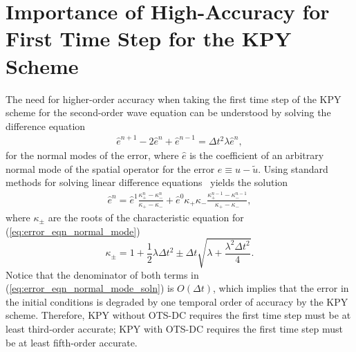 \documentclass[fleqn,12pt,twoside]{article}
\newcommand{\beq}{\begin{equation}}
\newcommand{\eeq}{\end{equation}}
\newcommand{\bea}{\begin{eqnarray}}
\newcommand{\eea}{\end{eqnarray}}
\def\tu{\tilde{u}}
\def\he{\hat{e}}
\def\dt{\Delta t}
\begin{document}
\section{Importance of High-Accuracy for First Time Step for the KPY Scheme
         \label{appendix:KPY_analysis} }
The need for higher-order accuracy when taking the first time step of the KPY 
scheme for the second-order wave equation can be understood by solving the 
difference equation 
\bea
  \he^{n+1} - 2 \he^{n} + \he^{n-1} = \dt^2 \lambda \he^{n}
  \label{eq:error_eqn_normal_mode},
\eea
for the normal modes of the error, where $\he$ is the coefficient of an 
arbitrary normal mode of the spatial operator for the error 
$e \equiv u - \tu$.  Using standard methods for solving linear difference
equations~\cite{carrier_pearson_book} yields the solution
\bea
  \he^n = \he^1 \frac{\kappa_+^n - \kappa_-^n}{\kappa_+ - \kappa_-}
        + \he^0 \kappa_+ \kappa_-
          \frac{\kappa_+^{n-1} - \kappa_-^{n-1}}{\kappa_+ - \kappa_-},
  \label{eq:error_eqn_normal_mode_soln}
\eea
where $\kappa_\pm$ are the roots of the characteristic equation for
(\ref{eq:error_eqn_normal_mode})~\cite{kreiss2002}
\beq
  \kappa_\pm = 1 + \frac{1}{2} \lambda \dt^2
             \pm \dt \sqrt{\lambda + \frac{\lambda^2 \dt^2}{4}}.
\eeq
Notice that the denominator of both terms in
(\ref{eq:error_eqn_normal_mode_soln}) is $O(\dt)$, which implies that the
error in the initial conditions is degraded by one temporal order of accuracy
by the KPY scheme.  Therefore, KPY without OTS-DC requires the first time 
step must be at least third-order accurate; KPY with OTS-DC requires the 
first time step must be at least fifth-order accurate.


%
\end{document}
